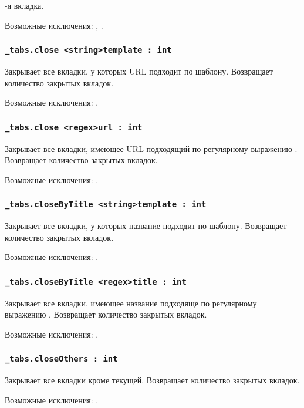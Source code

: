 -я вкладка.

Возможные исключения: , .

\subsubsection{\lstinline|_tabs.close <string>template : int|}

Закрывает все вкладки, у которых URL подходит по шаблону. Возвращает количество закрытых вкладок.

Возможные исключения: .

\subsubsection{\lstinline|_tabs.close <regex>url : int|}

Закрывает все вкладки, имеющее URL подходящий по регулярному выражению . Возвращает количество закрытых вкладок.

Возможные исключения: .

\subsubsection{\lstinline|_tabs.closeByTitle <string>template : int|}

Закрывает все вкладки, у которых название подходит по шаблону. Возвращает количество закрытых вкладок.

Возможные исключения: .

\subsubsection{\lstinline|_tabs.closeByTitle <regex>title : int|}

Закрывает все вкладки, имеющее название подходяще по регулярному выражению . Возвращает количество закрытых вкладок.

Возможные исключения: .

\subsubsection{\lstinline|_tabs.closeOthers : int|}

Закрывает все вкладки кроме текущей. Возвращает количество закрытых вкладок.

Возможные исключения: .

